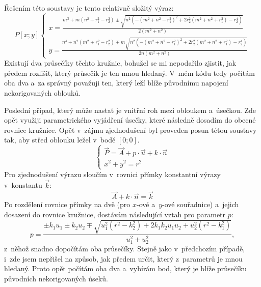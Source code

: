			Řešením této soustavy je tento relativně složitý výraz:
			\begin{equation}
				P[x;y]\begin{cases}
					x = \frac{m^3+m\left(n^2+r_1^2-r_2^2\right)\pm\sqrt{n^2\left(-\left(m^2+n^2-r_1^2\right)^2+2r_2^2\left(m^2+n^2+r_1^2\right)-r_2^4\right)}}{2\left(m^2+n^2\right)}\\
					y = \frac{n^4+n^2\left(m^2+r_1^2-r_2^2\right)\mp m \sqrt{n^2\left(-\left(m^2+n^2-r_1^2\right)^2+2r_2^2\left(m^2+n^2+r_1^2\right)-r_2^4\right)}}{2n\left(m^2+n^2\right)}
				\end{cases}
			\end{equation}
			Existují dva průsečíky těchto kružnic, bohužel se mi nepodařilo zjistit, jak předem rozlišit, který průsečík je ten mnou hledaný. V~mém kódu tedy počítám oba dva a~za správný považuji ten, který leží blíže původnímu napojení nekorigovaných oblouků.
			
			Poslední případ, který může nastat je vnitřní roh mezi obloukem a~úsečkou. Zde opět využiji parametrického vyjádření úsečky, které následně dosadím do obecné rovnice kružnice. Opět v~zájmu zjednodušení byl proveden posun tétou soustavy tak, aby střed oblouku ležel v~bodě $[0;0]$.
			\begin{equation}
				\begin{cases}
				\vec{P}=\vec{A}+p\cdot\vec{u}+k\cdot\vec{n} \\
				x^2+y^2=r^2
				\end{cases}
			\end{equation}
			Pro zjednodušení výrazu sloučím v~rovnici přímky konstantní výrazy v~konstantu $\vec{k}$:
			\begin{equation}
			\vec{A}+k\cdot\vec{n}=\vec{k}	
			\end{equation}
			Po rozdělení rovnice přímky na dvě (pro $x$-ové a~$y$-ové souřadnice) a~jejich dosazení do rovnice kružnice, dostávám následující vztah pro parametr $p$:
			\begin{equation}
				p=\frac{\pm k_1u_1\pm k_2u_2\mp\sqrt{u_1^2(r^2-k_2^2)+2k_1k_2u_1u_2+u_2^2(r^2-k_1^2)}}{u_1^2+u_2^2},
			\end{equation}
			z~něhož snadno dopočítám oba průsečíky. Stejně jako v~předchozím případě, i~zde jsem nepřišel na způsob, jak předem určit, který z~parametrů je mnou hledaný. Proto opět počítám oba dva a~vybírám bod, který je blíže průsečíku původních nekorigovaných úseků.
			
